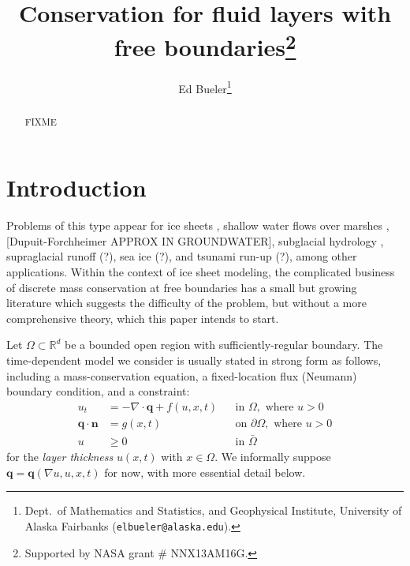 \documentclass[final,leqno,onefignum,onetabnum]{siamltex1213bueler}
\title{Conservation for fluid layers with free boundaries\thanks{Supported by NASA grant \# NNX13AM16G.}}
\author{Ed Bueler\thanks{Dept.~of Mathematics and Statistics, and Geophysical Institute, University of Alaska Fairbanks (\texttt{elbueler@alaska.edu}).}}
\newcommand\bn{\mathbf{n}}
\newcommand\bq{\mathbf{q}}
\newcommand{\Div}{\nabla\cdot}
\renewcommand{\grad}{\nabla}
\newcommand\RR{\mathbb{R}}
\begin{document}
\maketitle
{}%

\begin{abstract}
FIXME
\end{abstract}




\pagestyle{myheadings}
\thispagestyle{plain}

\section{Introduction}

Problems of this type appear for ice sheets \cite{BLKCB,CDDSV,EgholmNielsen2010,JouvetBueler2012}, shallow water flows over marshes \cite{AlonsoSantillanaDawson}, [Dupuit-Forchheimer APPROX IN GROUNDWATER], subglacial hydrology \cite{AschwandenBuelerKhroulevBlatter,BuelervanPeltDRAFT,Schoofetal2012}, supraglacial runoff (?), sea ice (?), and tsunami run-up (?), among other applications.  Within the context of ice sheet modeling, the complicated business of discrete mass conservation at free boundaries has a small but growing literature \cite{Albrechtetal2011,JaroschSchoofAnslow2013} which suggests the difficulty of the problem, but without a more comprehensive theory, which this paper intends to start.

Let $\Omega \subset \RR^d$ be a bounded open region with sufficiently-regular boundary.  The time-dependent model we consider is usually stated in strong form as follows, including a mass-conservation equation, a fixed-location flux (Neumann) boundary condition, and a constraint:
\begin{align}
u_t &= - \Div \bq + f(u,x,t) &&\text{in } \Omega, \text{ where } u > 0 \label{eq:massconserve} \\
\bq \cdot \bn &= g(x,t) &&\text{on } \partial\Omega, \text{ where } u > 0 \label{eq:fixedneumann} \\
u &\ge 0 &&\text{in } \bar\Omega \label{eq:constraint}
\end{align}
for the \emph{layer thickness} $u(x,t)$ with $x\in \Omega$.  We informally suppose $\bq = \bq(\grad u, u, x, t)$ for now, with more essential detail below.
\end{document}
